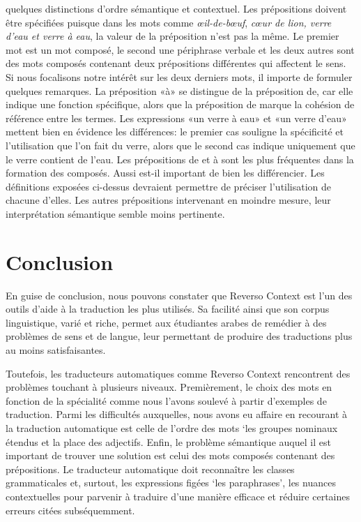 \documentclass{textolivre}
\begin{document}
quelques distinctions d’ordre sémantique et contextuel. Les prépositions doivent être spécifiées puisque dans les mots comme \textit{œil-de-bœuf}, \textit{cœur de lion, verre d’eau et verre à eau}, la valeur de la préposition n’est pas la même. Le premier mot est un mot composé, le second une périphrase verbale et les deux autres sont des mots composés contenant deux prépositions différentes qui affectent le sens. Si nous focalisons notre intérêt sur les deux derniers mots, il importe de formuler quelques remarques. La préposition «à» se distingue de la préposition de, car elle indique une fonction spécifique, alors que la préposition de marque la cohésion de référence entre les termes. Les expressions «un verre à eau» et «un verre d’eau» mettent bien en évidence les différences: le premier cas souligne la spécificité et l’utilisation que l’on fait du verre, alors que le second cas indique uniquement que le verre contient de l’eau. Les prépositions de et à sont les plus fréquentes dans la formation des composés. Aussi est-il important de bien les différencier. Les définitions exposées ci-dessus devraient permettre de préciser l’utilisation de chacune d’elles. Les autres prépositions intervenant en moindre mesure, leur interprétation sémantique semble moins pertinente.

\section{Conclusion}\label{sec-conclusoes}
En guise de conclusion, nous pouvons constater que Reverso Context est l’un des outils d’aide à la traduction les plus utilisés. Sa facilité ainsi que son corpus linguistique, varié et riche, permet aux étudiantes arabes de remédier à des problèmes de sens et de langue, leur permettant de produire des traductions plus au moins satisfaisantes.

Toutefois, les traducteurs automatiques comme Reverso Context rencontrent des problèmes touchant à plusieurs niveaux. Premièrement, le choix des mots en fonction de la spécialité comme nous l’avons soulevé à partir d’exemples de traduction. Parmi les difficultés auxquelles, nous avons eu affaire en recourant à la traduction automatique est celle de l’ordre des mots ‘les groupes nominaux étendus et la place des adjectifs. Enfin, le problème sémantique auquel il est important de trouver une solution est celui des mots composés contenant des prépositions. Le traducteur automatique doit reconnaître les classes grammaticales et, surtout, les expressions figées ‘les paraphrases’, les nuances contextuelles pour parvenir à traduire d’une manière efficace et réduire certaines erreurs citées subséquemment. 
\end{document}
